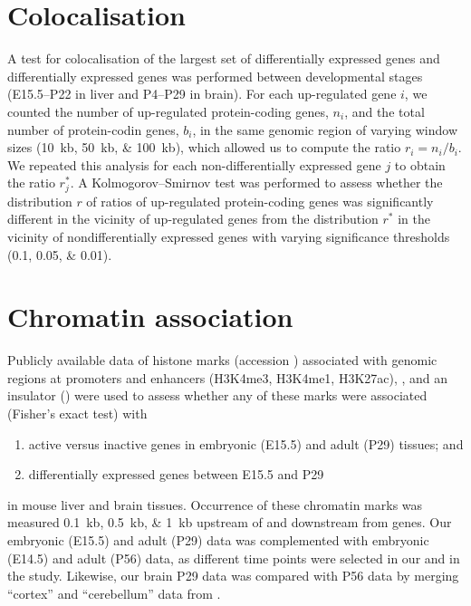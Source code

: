 \section{Colocalisation}

A test for colocalisation of the largest set of differentially expressed \trna
genes and differentially expressed \mrna genes was performed between
developmental stages (E15.5–P22 in liver and P4–P29 in brain). For each
up-regulated \trna gene \(i\), we counted the number of up-regulated
protein-coding genes, \(n_i\), and the total number of protein-codin genes,
\(b_i\), in the same genomic region of varying window sizes
(\SIlist{10;50;100}{kb}), which allowed us to compute the ratio \(r_i =
{n_i}/{b_i}\). We repeated this analysis for each non-differentially
expressed \trna gene \(j\) to obtain the ratio \(r_j^*\). A Kolmogorov–Smirnov
test was performed to assess whether the distribution \(r\) of ratios of
up-regulated protein-coding genes was significantly different in the vicinity of
up-regulated \trna genes from the distribution \(r^*\) in the vicinity of
nondifferentially expressed \trna genes with varying significance thresholds
(\numlist{0.1;0.05;0.01}).

\section{Chromatin association}

Publicly available \chipseq data of histone marks (\geo accession
) associated with genomic regions at promoters and
enhancers (H3K4me3, H3K4me1, H3K27ac), , and an insulator (\ctcf)
\citep{Shen:2012} were used to assess whether any of these marks were associated
(Fisher’s exact test) with

\begin{enumerate}
    \item active versus inactive \trna genes in embryonic (E15.5) and adult
        (P29) tissues; and
    \item differentially expressed \trna genes between E15.5 and P29
\end{enumerate}

in mouse liver and brain tissues. Occurrence of these chromatin marks was
measured \SIlist{0.1;0.5;1}{kb} upstream of and downstream from \trna genes. Our
embryonic (E15.5) and adult (P29)  data was complemented with embryonic
(E14.5) and adult (P56) \chipseq data, as different time points were selected in
our and in the \citet{Shen:2012} study. Likewise, our brain P29 data was
compared with P56 data by merging “cortex” and “cerebellum” \chipseq data from
\citet{Shen:2012}.

